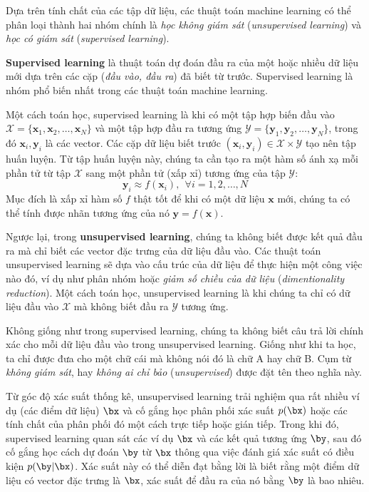 Dựa trên tính chất của các tập dữ liệu, các thuật toán machine learning có thể
phân loại thành hai nhóm chính là
\textit{học không giám sát} (\textit{unsupervised learning}) và \textit{học có
giám sát} (\textit{supervised learning}).

\textbf{Supervised learning} là thuật toán dự đoán đầu ra của một hoặc nhiều dữ
liệu mới dựa trên các cặp (\textit{đầu vào, đầu ra}) đã biết từ trước. 
Supervised learning là nhóm phổ biến nhất trong các thuật toán machine learning.

Một cách toán học, supervised learning là khi có một tập hợp biến đầu
vào $ \mathcal{X} = \{\mathbf{x}_1, \mathbf{x}_2, \dots, \mathbf{x}_N\} $ và một
tập hợp đầu ra tương ứng $ \mathcal{Y} = \{\mathbf{y}_1, \mathbf{y}_2, \dots,
\mathbf{y}_N\} $, trong đó $ \mathbf{x}_i, \mathbf{y}_i $ là các vector. Các cặp
dữ liệu biết trước $ (\mathbf{x}_i, \mathbf{y}_i) \in \mathcal{X} \times
\mathcal{Y} $ tạo nên tập huấn luyện. Từ
tập huấn luyện này, chúng ta cần tạo ra một hàm số ánh xạ mỗi phần tử từ tập
$\mathcal{X}$ sang một phần tử (xấp xỉ) tương ứng của tập $\mathcal{Y}$: $$
\mathbf{y}_i \approx f(\mathbf{x}_i), ~~ \forall i = 1, 2, \dots, N$$ Mục đích
là xấp xỉ hàm số $f$ thật tốt để khi có một dữ liệu $\mathbf{x}$ mới, chúng ta
có thể tính được nhãn tương ứng của nó $ \mathbf{y} = f(\mathbf{x})$. 


Ngược lại, trong \textbf{unsupervised learning}, chúng ta không biết được kết
quả đầu ra mà chỉ biết các vector đặc trưng của dữ liệu đầu vào. Các thuật toán
unsupervised learning sẽ dựa vào cấu trúc của dữ liệu để thực hiện một công việc
nào đó, ví dụ như phân nhóm hoặc \textit{giảm số chiều của dữ liệu}
(\textit{dimentionality reduction}). Một cách toán học, unsupervised learning là
khi chúng ta chỉ có dữ liệu đầu vào $\mathcal{X}$ mà không biết đầu ra 
$\mathcal{Y}$ tương ứng.

Không giống như trong supervised learning, chúng ta không biết câu trả lời chính
xác cho mỗi dữ liệu đầu vào trong unsupervised learning. Giống như khi ta học,
ta chỉ được đưa cho một chữ cái mà không nói đó là chữ A hay chữ B. Cụm từ
\textit{không giám sát}, hay \textit{không ai chỉ bảo} (\textit{unsupervised})
được đặt tên theo nghĩa này.

Từ góc độ xác suất thống kê, unsupervised learning trải nghiệm qua rất nhiều ví
dụ (các điểm dữ liệu) $\bx$ và cố gắng học phân phối xác suất $p(\bx)$ hoặc các
tính chất của phân phối đó một cách trực tiếp hoặc gián tiếp. Trong khi đó,
supervised learning quan sát các ví dụ $\bx$ và các kết quả tương ứng $\by$, sau
đó cố gắng học cách dự đoán $\by$ từ $\bx$ thông qua việc đánh giá xác suất có
điều kiện $p(\by |\bx)$. Xác suất này có thể diễn đạt bằng lời là biết rằng một
điểm dữ liệu có vector đặc trưng là $\bx$, xác suất để đầu ra của nó bằng $\by$
là bao nhiêu.

